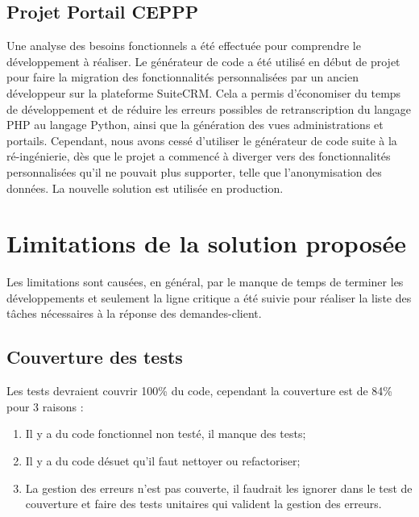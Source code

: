 \subsection{Projet Portail CEPPP}

Une analyse des besoins fonctionnels a été effectuée pour comprendre le développement à réaliser. Le générateur de code a été utilisé en début de projet pour faire la migration des fonctionnalités personnalisées par un ancien développeur sur la plateforme SuiteCRM. Cela a permis d'économiser du temps de développement et de réduire les erreurs possibles de retranscription du langage PHP au langage Python, ainsi que la génération des vues administrations et portails. Cependant, nous avons cessé d'utiliser le générateur de code suite à la ré-ingénierie, dès que le projet a commencé à diverger vers des fonctionnalités personnalisées qu’il ne pouvait plus supporter, telle que l'anonymisation des données. La nouvelle solution est utilisée en production.

\section{Limitations de la solution proposée}\label{sec:Limitations}

Les limitations sont causées, en général, par le manque de temps de terminer les développements et seulement la ligne critique a été suivie pour réaliser la liste des tâches nécessaires à la réponse des demandes-client.

\subsection{Couverture des tests}
Les tests devraient couvrir 100\% du code, cependant la couverture est de 84\% pour 3 raisons :

\begin{enumerate}
    \item Il y a du code fonctionnel non testé, il manque des tests;
    \item Il y a du code désuet qu’il faut nettoyer ou refactoriser;
    \item La gestion des erreurs n’est pas couverte, il faudrait les ignorer dans le test de couverture et faire des tests unitaires qui valident la gestion des erreurs.
\end{enumerate}

